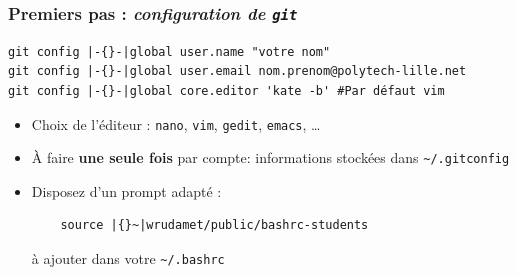 \documentclass[table,tikz,12pt,svgnames]{beamer}
\begin{document}
\begin{frame}[fragile]
\frametitle{Premiers pas : \textit{configuration de \texttt{git}}}
\begin{adjustwidth}{0em}{0cm}{}
\begin{verbatim}
git config |-{}-|global user.name "votre nom"
git config |-{}-|global user.email nom.prenom@polytech-lille.net
git config |-{}-|global core.editor 'kate -b' #Par défaut vim
\end{verbatim}

\end{adjustwidth}
\vspace{-1em}
\begin{block}{}
\begin{itemize}
\item Choix de l'éditeur : \texttt{nano}, \texttt{vim}, \texttt{gedit}, \texttt{emacs}, \ldots
\item À faire \textbf{une seule fois} par compte: informations stockées dans \texttt{\textasciitilde/.gitconfig}
\item Disposez d'un prompt adapté :
\begin{verbatim}
	source |{}~|wrudamet/public/bashrc-students
\end{verbatim}
\small à ajouter dans votre \texttt{\textasciitilde/.bashrc}
\end{itemize}
\end{block}

\end{frame}
\end{document}
